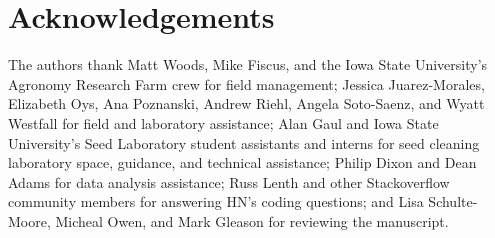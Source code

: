 \documentclass[
]{article}
\begin{document}
\hypertarget{acknowledgements}{%
\section*{Acknowledgements}\label{acknowledgements}}

The authors thank Matt Woods, Mike Fiscus, and the Iowa State University's Agronomy Research Farm crew for field management; Jessica Juarez-Morales, Elizabeth Oys, Ana Poznanski, Andrew Riehl, Angela Soto-Saenz, and Wyatt Westfall for field and laboratory assistance; Alan Gaul and Iowa State University's Seed Laboratory student assistants and interns for seed cleaning laboratory space, guidance, and technical assistance; Philip Dixon and Dean Adams for data analysis assistance; Russ Lenth and other Stackoverflow community members for answering HN's coding questions; and Lisa Schulte-Moore, Micheal Owen, and Mark Gleason for reviewing the manuscript.

\renewcommand\refname{References}
  
\end{document}
